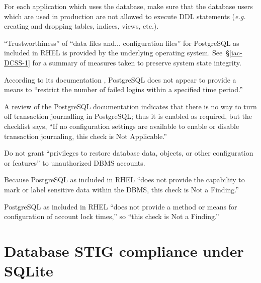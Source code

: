 %
For each application which uses the database, make sure that the database
users which are used in production are not allowed to execute DDL
statements (\emph{e.g.} creating and dropping tables, indices, views,
etc.).

%
``Trustworthiness'' of ``data files and... configuration files'' for
PostgreSQL as included in RHEL is provided by the underlying operating
system. See~\S\ref{iac-DCSS-1} for a summary of measures taken to preserve
system state integrity.

%
According to its documentation \cite{pgsql-documentation}, PostgreSQL does
not appear to provide a means to ``restrict the number of failed logins
within a specified time period.''

%
A review of the PostgreSQL documentation \cite{pgsql-documentation}
indicates that there is no way to turn off transaction journalling in
PostgreSQL; thus it is enabled as required, but the checklist says, ``If
no configuration settings are available to enable or disable transaction
journaling, this check is Not Applicable.''

%
Do not grant ``privileges to restore database data, objects, or other
configuration or features'' to unauthorized DBMS accounts. 

%
Because PostgreSQL as included in RHEL ``does not provide the capability
to mark or label sensitive data within the DBMS, this check is Not a
Finding.''

%
PostgreSQL as included in RHEL ``does not provide a method or means for
configuration of account lock times,'' so ``this check is Not a Finding.''








\section{Database STIG compliance under SQLite}
\label{DatabaseSTIGSQLite}

